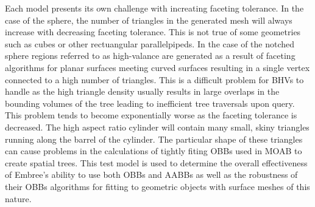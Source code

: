 \documentclass{anstrans}
\begin{document}
Each model presents its own challenge with increating faceting tolerance. In the case of the sphere, the number of triangles in the generated mesh will always increase with decreasing faceting tolerance. This is not true of some geometries such as cubes or other rectuangular parallelpipeds. In the case of the notched sphere regions referred to as high-valance are generated as a result of faceting algorithms for planar surfaces meeting curved surfaces resulting in a single vertex connected to a high number of triangles. This is a difficult problem for BHVs to handle as the high triangle density usually results in large overlaps in the bounding volumes of the tree leading to inefficient tree traversals upon query. This problem tends to become exponentially worse as the faceting tolerance is decreased. The high aspect ratio cylinder will contain many small, skiny triangles running along the barrel of the cylinder. The particular shape of these triangles can cause problems in the calculations of tightly fiting OBBs used in MOAB to create spatial trees. This test model is used to determine the overall effectiveness of Embree's ability to use both OBBs and AABBs as well as the robustness of their OBBs algorithms for fitting to geometric objects with surface meshes of this nature.







\end{document}

